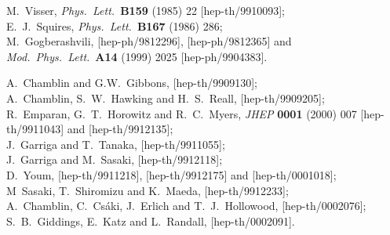 \documentclass[a4paper,12pt]{article}
\begin{document}
\begin{thebibliography}{99}
M.~Visser,
{\it Phys.\ Lett.}\  {\bf B159} (1985) 22
[hep-th/9910093];\\
%
E.~J.~Squires,
{\it Phys.\ Lett.}\  {\bf B167} (1986) 286;\\
%
M.~Gogberashvili,
[hep-ph/9812296], [hep-ph/9812365] and
{\it Mod.\ Phys.\ Lett.}\  {\bf A14} (1999) 2025
[hep-ph/9904383].



A.~Chamblin and G.W.~Gibbons,
[hep-th/9909130];\\
%
A.~Chamblin, S.~W.~Hawking and H.~S.~Reall,
[hep-th/9909205];\\
%
R.~Emparan, G.~T.~Horowitz and R.~C.~Myers,
{\it JHEP} {\bf 0001} (2000) 007
[hep-th/9911043]
and
[hep-th/9912135];\\
%
J.~Garriga and T.~Tanaka,
[hep-th/9911055];\\
%
J.~Garriga and M.~Sasaki,
[hep-th/9912118];\\
%
D.~Youm,
[hep-th/9911218],
[hep-th/9912175] and [hep-th/0001018];\\
%
M~Sasaki, T.~Shiromizu and K.~Maeda,
[hep-th/9912233];\\
%
A.~Chamblin, C.~Cs\'aki, J.~Erlich and T.~J.~Hollowood,
[hep-th/0002076];\\
%
S.~B.~Giddings, E.~Katz and L.~Randall,
[hep-th/0002091].



\end{thebibliography}
\end{document}
